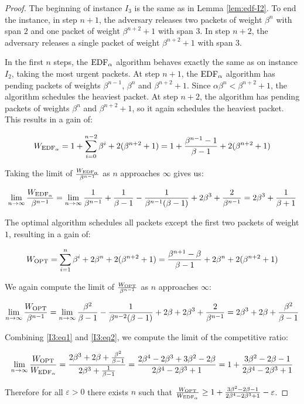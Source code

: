 \begin{proof}
The beginning of instance $I_3$ is the same as in Lemma \ref{lem:edf-I2}. To end
the instance, in step $n+1$, the adversary releases two packets of weight
$\beta^{n}$ with span $2$ and one packet of weight $\beta^{n+2} + 1$ with
span $3$. In step $n+2$, the adversary releases a single packet of weight
$\beta^{n+2} + 1$ with span $3$.

In the first $n$ steps, the $\text{EDF}_\alpha$ algorithm behaves exactly the same as on
instance $I_2$, taking the most urgent packets. At step $n+1$,
the $\text{EDF}_\alpha$ algorithm has pending packets of weights $\beta^{n-1}$, $\beta^n$ and
$\beta^{n+2} + 1$. Since $\alpha \beta^n < \beta^{n+2} + 1$, the
algorithm schedules the heaviest packet. At step $n+2$, the algorithm has
pending packets of weights $\beta^n$ and $\beta^{n+2} + 1$, so it again
schedules the heaviest packet. This results in a gain of:

\[
W_{\text{EDF}_\alpha} = 1 + \sum_{i = 0}^{n-2} \beta^i + 2(\beta^{n+2} + 1) = 1 + \frac{\beta^{n-1} - 1}{\beta - 1} + 2(\beta^{n+2} + 1)
\]

Taking the limit of $\frac{W_{\text{EDF}_\alpha}}{\beta^{n-1}}$ as $n$ approaches $\infty$ gives us:

\begin{equation}\label{I3:eq1}
\lim_{n \to \infty} \frac{W_{\text{EDF}_\alpha}}{\beta^{n-1}} =
\lim_{n \to \infty} \frac{1}{\beta^{n-1}} + \frac{1}{\beta - 1} -
\frac{1}{\beta^{n-1}(\beta - 1)} + 2\beta^3 + \frac{2}{\beta^{n-1}} =
2 \beta^3 + \frac{1}{\beta + 1}
\end{equation}

The optimal algorithm schedules all packets except the first two packets of
weight $1$, resulting in a gain of:

\[
W_{\text{OPT}} = \sum_{i=1}^n \beta^i + 2\beta^n + 2(\beta^{n+2} + 1) =
\frac{\beta^{n+1} - \beta}{\beta - 1} + 2\beta^n + 2(\beta^{n+2} + 1)
\]

We again compute the limit of $\frac{W_{\text{OPT}}}{\beta^{n-1}}$ as $n$ approaches $\infty$:

\begin{equation}\label{I3:eq2}
\lim_{n \to \infty} \frac{W_{\text{OPT}}}{\beta^{n-1}} =
\lim_{n \to \infty} \frac{\beta^2}{\beta - 1} -
\frac{1}{\beta^{n-2}(\beta - 1)} + 2\beta + 2\beta^3 + \frac{2}{\beta^{n-1}} =
2\beta^3 + 2\beta + \frac{\beta^2}{\beta-1}
\end{equation}

Combining \ref{I3:eq1} and \ref{I3:eq2}, we compute the limit of the competitive
ratio:

\[
\lim_{n \to \infty} \frac{W_{\text{OPT}}}{W_{\text{EDF}_\alpha}} =
\frac{2\beta^3 + 2\beta + \frac{\beta^2}{\beta-1}}{2\beta^3 + \frac{1}{\beta - 1}} =
\frac{2\beta^4 - 2\beta^3 + 3\beta^2 - 2\beta}{2\beta^4 - 2\beta^3 + 1} =
1 + \frac{3\beta^2 - 2\beta - 1}{2\beta^4 - 2\beta^3 + 1}
\]

Therefore for all $\varepsilon > 0$ there exists $n$ such that
$\frac{W_{\text{OPT}}}{W_{\text{EDF}_\alpha}} \geq 1 + \frac{3\beta^2 - 2\beta - 1}{2\beta^4 - 2\beta^3 + 1} - \varepsilon$.
\end{proof}

